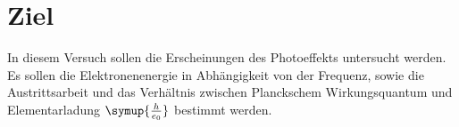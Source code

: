 \section{Ziel}
\label{sec:Ziel}

In diesem Versuch sollen die Erscheinungen des Photoeffekts untersucht werden. Es sollen die 
Elektronenenergie in Abhängigkeit von der Frequenz, sowie die Austrittsarbeit und das Verhältnis 
zwischen Planckschem Wirkungsquantum und Elementarladung $\symup{\frac{h}{e_0}}$ bestimmt werden.